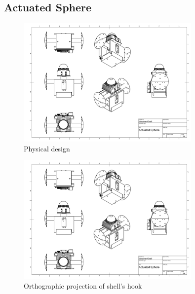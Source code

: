 \documentclass[english, bachelor, utf8]{base/thesis_telematics}
\begin{document}
\clearpage %

\subsection{Actuated Sphere}
\label{sec:actuated-sphere-drawings}
\clearpage %

\begin{figure}
\centering
\includegraphics[width=0.80\textwidth,page=1]{pics/Actuated_Sphere_Drawing.pdf}
\caption{Physical design}
\label{fig:act_system_page1}
\end{figure}

\begin{figure}[H]
\centering
\includegraphics[width=0.80\textwidth,page=2]{pics/Actuated_Sphere_Drawing.pdf}
\caption{Orthographic projection of shell's hook}
\label{fig:act_system_page2}
\end{figure}
\end{document}
